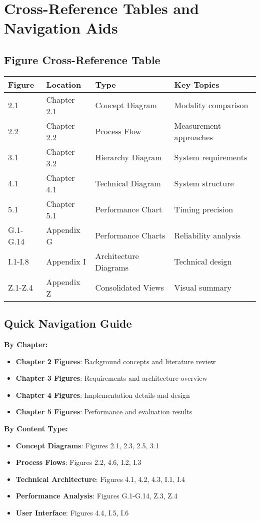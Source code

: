 \section{Cross-Reference Tables and Navigation Aids}

\subsection{Figure Cross-Reference Table}

\begin{longtable}{|l|l|l|p{6cm}|}
\hline
\textbf{Figure} & \textbf{Location} & \textbf{Type} & \textbf{Key Topics} \\
\hline
\endhead
2.1 & Chapter 2.1 & Concept Diagram & Modality comparison \\
2.2 & Chapter 2.2 & Process Flow & Measurement approaches \\
3.1 & Chapter 3.2 & Hierarchy Diagram & System requirements \\
4.1 & Chapter 4.1 & Technical Diagram & System structure \\
5.1 & Chapter 5.1 & Performance Chart & Timing precision \\
G.1-G.14 & Appendix G & Performance Charts & Reliability analysis \\
I.1-I.8 & Appendix I & Architecture Diagrams & Technical design \\
Z.1-Z.4 & Appendix Z & Consolidated Views & Visual summary \\
\hline
\end{longtable}

\subsection{Quick Navigation Guide}

\textbf{By Chapter:}
\begin{itemize}
\item \textbf{Chapter 2 Figures}: Background concepts and literature review
\item \textbf{Chapter 3 Figures}: Requirements and architecture overview
\item \textbf{Chapter 4 Figures}: Implementation details and design
\item \textbf{Chapter 5 Figures}: Performance and evaluation results
\end{itemize}

\textbf{By Content Type:}
\begin{itemize}
\item \textbf{Concept Diagrams}: Figures 2.1, 2.3, 2.5, 3.1
\item \textbf{Process Flows}: Figures 2.2, 4.6, I.2, I.3
\item \textbf{Technical Architecture}: Figures 4.1, 4.2, 4.3, I.1, I.4
\item \textbf{Performance Analysis}: Figures G.1-G.14, Z.3, Z.4
\item \textbf{User Interface}: Figures 4.4, I.5, I.6
\end{itemize}

